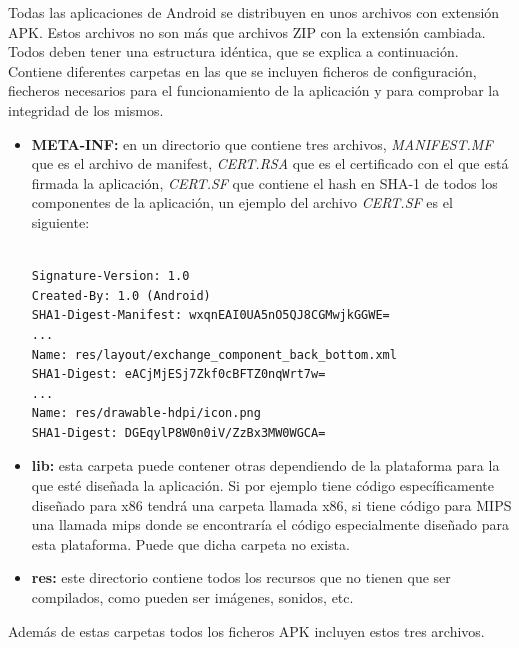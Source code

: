Todas las aplicaciones de Android se distribuyen en unos archivos con extensión APK. Estos archivos no son más que archivos ZIP con la extensión cambiada. Todos deben tener una estructura idéntica, que se explica a continuación. Contiene diferentes carpetas en las que se incluyen ficheros de configuración, fiecheros necesarios para el funcionamiento de la aplicación y para comprobar la integridad de los mismos.

\begin{itemize}

\item \textbf{META-INF:} en un directorio que contiene tres archivos, \textit{MANIFEST.MF} que es el archivo de manifest, \textit{CERT.RSA} que es el certificado con el que está firmada la aplicación, \textit{CERT.SF} que contiene el hash en SHA-1 de todos los componentes de la aplicación, un ejemplo del archivo \textit{CERT.SF} es el siguiente:

\begin{verbatim}

Signature-Version: 1.0
Created-By: 1.0 (Android)
SHA1-Digest-Manifest: wxqnEAI0UA5nO5QJ8CGMwjkGGWE=
...
Name: res/layout/exchange_component_back_bottom.xml
SHA1-Digest: eACjMjESj7Zkf0cBFTZ0nqWrt7w=
...
Name: res/drawable-hdpi/icon.png
SHA1-Digest: DGEqylP8W0n0iV/ZzBx3MW0WGCA=
\end{verbatim}

\item \textbf{lib:} esta carpeta puede contener otras dependiendo de la plataforma para la que esté diseñada la aplicación. Si por ejemplo tiene código específicamente diseñado para x86 tendrá una carpeta llamada x86, si tiene código para MIPS una llamada mips donde se encontraría el código especialmente diseñado para esta plataforma. Puede que dicha carpeta no exista.

\item \textbf{res:} este directorio contiene todos los recursos que no tienen que ser compilados, como pueden ser imágenes, sonidos, etc.

\end{itemize}

Además de estas carpetas todos los ficheros APK incluyen estos tres archivos.

